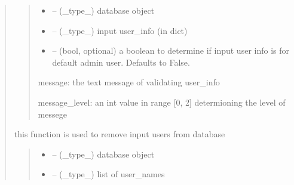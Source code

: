 \documentclass[letterpaper,10pt,english]{sphinxmanual}
\begin{document}
\begin{quote}
\begin{savenotes}
\begin{fulllineitems}
\begin{quote}
\begin{description}
\begin{itemize}
\item {} 
\sphinxAtStartPar
{} – (\_type\_) database object

\item {} 
\sphinxAtStartPar
{} – (\_type\_) input user\_info (in dict)

\item {} 
\sphinxAtStartPar
{} – (bool, optional) a boolean to determine if input user info is for default admin user. Defaults to False.

\end{itemize}

\sphinxAtStartPar
message: the text message of validating user\_info

\sphinxAtStartPar
message\_level: an int value in range {[}0, 2{]} determioning the level of messege

\end{description}\end{quote}

\end{fulllineitems}\end{savenotes}


\begin{savenotes}\begin{fulllineitems}
\label{\detokenize{setting/backend/user_management_funcs:oxin.backend.user_management_funcs.remove_users_from_db}}
\pysigstartsignatures
{}
\pysigstopsignatures
\sphinxAtStartPar
this function is used to remove input users from database
\begin{quote}\begin{description}
\begin{itemize}
\item {} 
\sphinxAtStartPar
{} – (\_type\_) database object

\item {} 
\sphinxAtStartPar
{} – (\_type\_) list of user\_names


\end{itemize}
\end{description}
\end{quote}
\end{fulllineitems}
\end{savenotes}
\end{quote}
\end{document}
